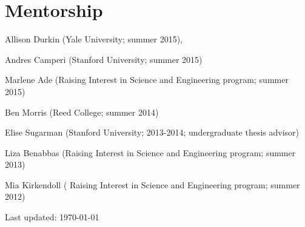 \documentclass[letterpaper]{article}
\def\footerlink{}
\renewenvironment{itemize}{
  \begin{list}{}{
    \setlength{\leftmargin}{1.5em}
  }
}{
  \end{list}
}
\begin{document}
\section*{Mentorship}
\begin{itemize}
\item Allison Durkin (Yale University; summer 2015), 
\item Andres Camperi (Stanford University; summer 2015)
\item Marlene Ade (Raising Interest in Science and Engineering program; summer 2015)
\item Ben Morris (Reed College; summer 2014)
\item Elise Sugarman (Stanford University;  2013-2014; undergraduate thesis advisor)
\item Liza Benabbas (Raising Interest in Science and Engineering program; summer 2013)
\item Mia Kirkendoll ( Raising Interest in Science and Engineering program; summer 2012)

\end{itemize}


\bigskip

\begin{center}
  \begin{footnotesize}
    Last updated: \today \\
    \href{\footerlink}{\texttt{\footerlink}}
  \end{footnotesize}
\end{center}
\end{document}
